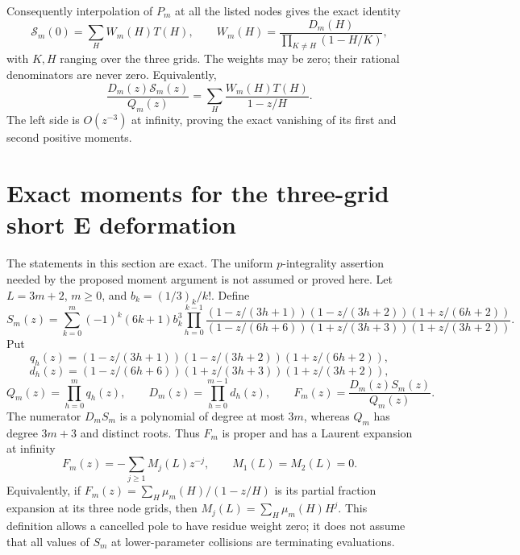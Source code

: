 \documentclass[11pt,letterpaper]{article}
\numberwithin{equation}{section}
\begin{document}
Consequently interpolation of $P_m$ at all the listed nodes gives
the exact identity
\[
 \mathcal S_m(0)=\sum_H W_m(H)T(H),\qquad
 W_m(H)=\frac{D_m(H)}{\prod_{K\ne H}(1-H/K)},
\]
with $K,H$ ranging over the three grids. The weights may be zero;
their rational denominators are never zero.
Equivalently,
\[
 \frac{D_m(z)\mathcal S_m(z)}{Q_m(z)}
 =\sum_H\frac{W_m(H)T(H)}{1-z/H}.
\]
The left side is $O(z^{-3})$ at infinity, proving the exact
vanishing of its first and second positive moments.

\section{Exact moments for the three-grid short E deformation}\label{loc-VI-4}
\label{VI-sec:e-three-grid-moments}
The statements in this section are exact. The uniform $p$-integrality
assertion needed by the proposed moment argument is not assumed or
proved here.
Let $L=3m+2$, $m\ge0$, and $b_k=(1/3)_k/k!$. Define
\[
 S_m(z)=\sum_{k=0}^m(-1)^k(6k+1)b_k^3
 \prod_{h=0}^{k-1}
 \frac{(1-z/(3h+1))(1-z/(3h+2))(1+z/(6h+2))}
 {(1-z/(6h+6))(1+z/(3h+3))(1+z/(3h+2))}.
\]
Put
\[
 q_h(z)=(1-z/(3h+1))(1-z/(3h+2))(1+z/(6h+2)),
\]
\[
 d_h(z)=(1-z/(6h+6))(1+z/(3h+3))(1+z/(3h+2)),
\]
\[
 Q_m(z)=\prod_{h=0}^m q_h(z),\qquad
 D_m(z)=\prod_{h=0}^{m-1}d_h(z),\qquad
 F_m(z)=\frac{D_m(z)S_m(z)}{Q_m(z)}.
\]
The numerator $D_mS_m$ is a polynomial of degree at most $3m$,
whereas $Q_m$ has degree $3m+3$ and distinct roots. Thus $F_m$ is
proper and has a Laurent expansion at infinity
\[
 F_m(z)=-\sum_{j\ge1}M_j(L)z^{-j},\qquad M_1(L)=M_2(L)=0.
\]
Equivalently, if $F_m(z)=\sum_H\mu_m(H)/(1-z/H)$ is its partial
fraction expansion at its three node grids, then
$M_j(L)=\sum_H\mu_m(H)H^j$. This definition allows a cancelled pole
to have residue weight zero; it does not assume that all values of
$S_m$ at lower-parameter collisions are terminating evaluations.
\end{document}

